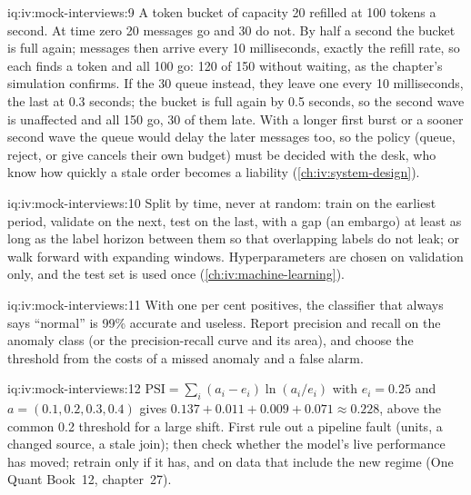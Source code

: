 \begin{solution}{iq:iv:mock-interviews:9}
A token bucket of capacity 20 refilled at 100 tokens a second. At time zero 20 messages go and 30 do not. By half a second the bucket
is full again; messages then arrive every 10 milliseconds, exactly the refill rate, so each finds a token and all 100 go: 120 of 150
without waiting, as the chapter's simulation confirms. If the 30 queue instead, they leave one every 10 milliseconds, the last at
0.3 seconds; the bucket is full again by 0.5 seconds, so the second wave is unaffected and all 150 go, 30 of them late. With
a longer first burst or a sooner second wave the queue would delay the later messages too, so the policy (queue, reject, or
give cancels their own budget) must be decided with the desk, who know how quickly a stale order becomes a liability
(\cref{ch:iv:system-design}).
\end{solution}

\begin{solution}{iq:iv:mock-interviews:10}
Split by time, never at random: train on the earliest period, validate on the next, test on the last, with a gap (an embargo) at least
as long as the label horizon between them so that overlapping labels do not leak; or walk forward with expanding windows. Hyperparameters
are chosen on validation only, and the test set is used once (\cref{ch:iv:machine-learning}).
\end{solution}

\begin{solution}{iq:iv:mock-interviews:11}
With one per cent positives, the classifier that always says ``normal'' is 99\% accurate and useless. Report precision and recall
on the anomaly class (or the precision-recall curve and its area), and choose the threshold from the costs of a missed anomaly and a
false alarm.
\end{solution}

\begin{solution}{iq:iv:mock-interviews:12}
$\mathrm{PSI} = \sum_i (a_i - e_i)\ln(a_i/e_i)$ with $e_i = 0.25$ and $a = (0.1, 0.2, 0.3, 0.4)$ gives $0.137 + 0.011 + 0.009 +
0.071 \approx 0.228$, above the common 0.2 threshold for a large shift. First rule out a pipeline fault (units, a changed source, a
stale join); then check whether the model's live performance has moved; retrain only if it has, and on data that include the new
regime (One Quant Book~12, chapter~27).
\end{solution}

